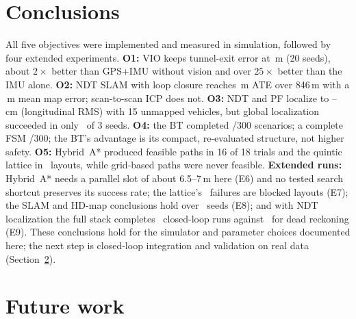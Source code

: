 \documentclass[11pt,a4paper]{article}
\begin{document}
\section{Conclusions}
All five objectives were implemented and measured in simulation, followed by four extended experiments.
\textbf{O1:} VIO keeps tunnel-exit error at \vioExitVio\,m (20 seeds), about $2\times$ better than GPS+IMU without vision and over $25\times$ better than the IMU alone.
\textbf{O2:} NDT SLAM with loop closure reaches \slamLoop\,m ATE over 846\,m with a \slamMapLoop\,m mean map error; scan-to-scan ICP does not.
\textbf{O3:} NDT and PF localize to \hdNdtLon--\hdPfLon\,cm (longitudinal RMS) with 15 unmapped vehicles, but global localization succeeded in only \hdGlobOk\ of 3 seeds.
\textbf{O4:} the BT completed \btOk/300 scenarios; a complete FSM \fsmFullOk/300; the BT's advantage is its compact, re-evaluated structure, not higher safety.
\textbf{O5:} Hybrid~A* produced feasible paths in 16 of 18 trials and the quintic lattice in \latQuinticOk\ layouts, while grid-based paths were never feasible.
\textbf{Extended runs:} Hybrid~A* needs a parallel slot of about 6.5--7\,m here (E6) and no tested search shortcut preserves its success rate; the lattice's \lfFail\ failures are blocked layouts (E7); the SLAM and HD-map conclusions hold over \sensSeeds\ seeds (E8); and with NDT localization the full stack completes \clNdt\ closed-loop runs against \clDr\ for dead reckoning (E9).
These conclusions hold for the simulator and parameter choices documented here; the next step is closed-loop integration and validation on real data (Section~\ref{sec:future}).

\section{Future work}\label{sec:future}
\end{document}

